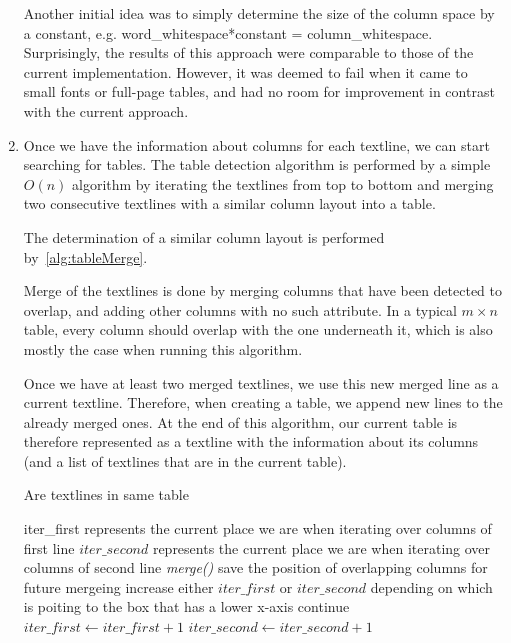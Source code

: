 \begin{enumerate}
Another initial idea was to simply determine the size of the column space by a constant, e.g. word\_whitespace*constant = column\_whitespace. Surprisingly, the results of this approach were comparable to those of the current implementation. However, it was deemed to fail when it came to small fonts or full-page tables, and had no room for improvement in contrast with the current approach.

\item \emph{}

Once we have the information about columns for each textline, we can start searching for tables. The table detection algorithm is performed by a simple $O(n)$ algorithm by iterating the textlines from top to bottom and merging two consecutive textlines with a similar column layout into a table.

The determination of a similar column layout is performed by~\cref{alg:tableMerge}. 

Merge of the textlines is done by merging columns that have been detected to overlap, and adding other columns with no such attribute. In a typical $m{\times}n$ table, every column should overlap with the one underneath it, which is also mostly the case when running this algorithm.

Once we have at least two merged textlines, we use this new merged line as a current textline. Therefore, when creating a table, we append new lines to the already merged ones. At the end of this algorithm, our current table is therefore represented as a textline with the information about its columns (and a list of textlines that are in the current table).

\begin{algorithm}[p]
\caption{Are textlines in same table}
{\scriptsize
\label{alg:tableMerge}
\begin{algorithmic}
\Require iter\_first \Comment represents the current place we are when iterating over columns of first line
\State $iter\_second$ represents the current place we are when iterating over columns of second line
\State \emph{merge()}
\EndIf
\EndIf
{} 
\State save the position of overlapping columns for future mergeing
\EndIf
\Else 
\State increase either $iter\_first$ or $iter\_second$ depending on which is poiting to the box that has a lower x-axis
\State continue
\EndIf
\State $iter\_first \gets iter\_first+1$
\State $iter\_second \gets iter\_second+1$
\EndWhile
\end{algorithmic}}
\end{algorithm}


\end{enumerate}
